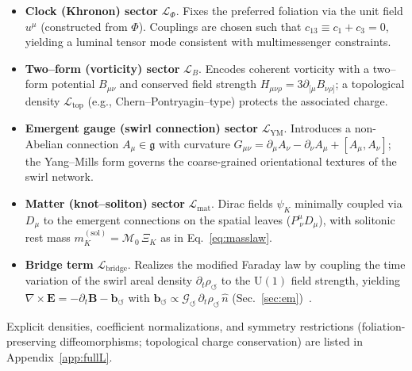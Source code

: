 \documentclass[10pt,reprint,aps,onecolumn,nofootinbib]{revtex4-2}
\newcommand{\vect}[1]{\boldsymbol{#1}} %
\begin{document}
            \begin{itemize}
                \item \textbf{Clock (Khronon) sector} \(\mathcal{L}_\Phi\).\; Fixes the preferred foliation via the unit field \(u^\mu\) (constructed from \(\Phi\)). Couplings are chosen such that \(c_{13}\equiv c_1+c_3=0\), yielding a luminal tensor mode consistent with multimessenger constraints.

                \item \textbf{Two–form (vorticity) sector} \(\mathcal{L}_B\).\; Encodes coherent vorticity with a two–form potential \(B_{\mu\nu}\) and conserved field strength \(H_{\mu\nu\rho}=3\partial_{[\mu}B_{\nu\rho]}\); a topological density \(\mathcal{L}_{\mathrm{top}}\) (e.g., Chern–Pontryagin–type) protects the associated charge.

                \item \textbf{Emergent gauge (swirl connection) sector} \(\mathcal{L}_{\mathrm{YM}}\).\; Introduces a non-Abelian connection \(A_\mu\in\mathfrak{g}\) with curvature
                \(G_{\mu\nu}=\partial_\mu A_\nu-\partial_\nu A_\mu+[A_\mu,A_\nu]\); the Yang–Mills form governs the coarse-grained orientational textures of the swirl network.

                \item \textbf{Matter (knot–soliton) sector} \(\mathcal{L}_{\mathrm{mat}}\).\; Dirac fields \(\psi_K\) minimally coupled via \(D_\mu\) to the emergent connections on the spatial leaves (\(P^\mu_{\ \nu}D_\mu\)), with solitonic rest mass  \(m_K^{(\mathrm{sol})}=\mathcal{M}_0\,\Xi_K\) as in Eq.~\eqref{eq:masslaw}. ~\cite{MantonSutcliffe2004,Skyrme1962}

                \item \textbf{Bridge term} \(\mathcal{L}_{\mathrm{bridge}}\).\; Realizes the modified Faraday law by coupling the time variation of the swirl areal density \(\partial_t\rho_{\circlearrowleft}\) to the \(\mathrm{U}(1)\) field strength, yielding
                \(\nabla\times \vect{E}=-\partial_t \vect{B}-\vect{b}_{\circlearrowleft}\) with
                \(\vect{b}_{\circlearrowleft}\propto \mathcal{G}_{\circlearrowleft}\,\partial_t\rho_{\circlearrowleft}\,\hat n\) (Sec.~\ref{sec:em})~\cite{EM_G}.
            \end{itemize}

            Explicit densities, coefficient normalizations, and symmetry restrictions (foliation-preserving diffeomorphisms; topological charge conservation) are listed in Appendix~\ref{app:fullL}.
\end{document}
